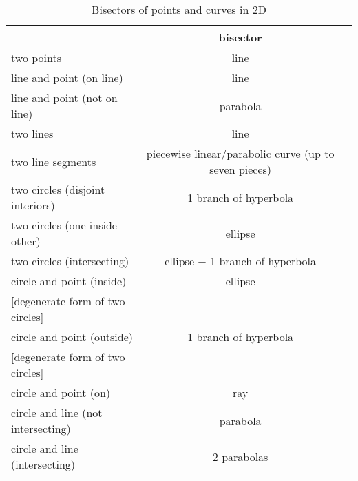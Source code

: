\begin{table}
\label{yap-table}
\centering
\begin{tabular}{|l|c|c|}
\hline
			& bisector \\ \hline
two points 		& line \\ \hline
line and point (on line)& line\footnotemark[6] \\ \hline
line and point (not on line) &	parabola \\ \hline
two lines 		& line\footnotemark[7] \\ \hline
two line segments	& piecewise linear/parabolic curve (up to seven 
			  pieces) \\ \hline
two circles (disjoint interiors) & 1 branch of hyperbola\footnotemark[8]
		\\ \hline
two circles (one inside other) & ellipse\footnotemark[9]	\\ \hline
two circles (intersecting) & ellipse + 1 branch of hyperbola\footnotemark[10]
	\\ \hline
circle and point (inside) & ellipse \\
{[degenerate form of two circles]} &  \\ \hline
circle and point (outside) & 1 branch of hyperbola \\
{[degenerate form of two circles]} & \\ \hline
circle and point (on)	  & ray\footnotemark[11] \\ \hline
circle and line (not intersecting)
			& parabola\footnotemark[12]	\\ \hline
circle and line (intersecting)     & 2 parabolas\footnotemark[13] \\ \hline 
\end{tabular}
\caption{Bisectors of points and curves in 2D}

\end{table}
